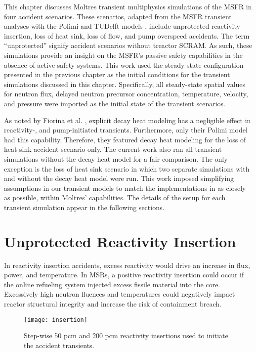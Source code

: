 This chapter discusses Moltres transient multiphysics simulations of the
\gls{MSFR} in four accident scenarios. These scenarios, adapted from the
\gls{MSFR} transient analyses with the Polimi and TUDelft models
\cite{fiorina_modelling_2014}, include unprotected reactivity
insertion, loss of heat sink, loss of flow, and pump overspeed accidents. The
term ``unprotected'' signify accident scenarios without treactor SCRAM. As
such, these simulations provide an insight on the
\gls{MSFR}'s passive safety capabilities in the absence
of active safety systems. This work used the steady-state configuration
presented in the previous chapter as the initial conditions for the transient
simulations discussed in this chapter. Specifically, all steady-state spatial
values for neutron flux, delayed neutron precursor concentration, temperature,
velocity, and pressure were imported as the initial state of the transient
scenarios.

As noted by Fiorina et al. \cite{fiorina_modelling_2014}, explicit decay heat
modeling has a negligible effect in reactivity-, and pump-initiated
transients. Furthermore, only their Polimi model had this capability.
Therefore, they featured decay heat modeling for the loss of heat sink
accident scenario only. The current work also ran all transient simulations
without the decay heat model for a fair comparison. The only exception is the
loss of heat sink scenario in which two separate simulations with and without
the decay heat model were run. This work imposed simplifying assumptions in
our transient models to match the implementations in
\cite{fiorina_modelling_2014} as closely as possible, within Moltres'
capabilities. The details of the setup for each
transient simulation appear in the following sections.

\section{Unprotected Reactivity Insertion}
In reactivity insertion accidents, excess reactivity would drive an increase
in flux, power, and temperature. In
\glspl{MSR}, a positive reactivity insertion could occur if the online
refueling system injected excess fissile material into the core. Excessively
high neutron fluences and temperatures could negatively impact reactor
structural integrity and increase the risk of containment breach.

\begin{figure}[htbp!]
    \centering
    \texttt{[image: insertion]}
    \caption{Step-wise 50 pcm and 200 pcm reactivity insertions used to
    initiate the accident transients.}
    \label{fig:insertion}
\end{figure}


